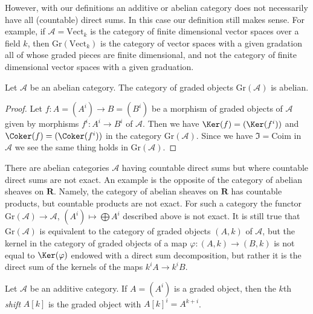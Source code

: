 \medskip\noindent
However, with our definitions an additive or abelian category does not
necessarily have all (countable) direct sums. In this case our definition
still makes sense. For example, if $\mathcal{A} = \text{Vect}_k$ is the
category of finite dimensional vector spaces over a field $k$, then
$\text{Gr}(\text{Vect}_k)$ is the category of vector
spaces with a given gradation all of whose graded pieces are finite
dimensional, and not the category of finite dimensional vector
spaces with a given graduation.

\begin{lemma}
\label{lemma-graded}
Let $\mathcal{A}$ be an abelian category. The category of graded objects
$\text{Gr}(\mathcal{A})$ is abelian.
\end{lemma}

\begin{proof}
Let $f : A = (A^i) \to B = (B^i)$ be a morphism of graded objects
of $\mathcal{A}$ given by
morphisms $f^i : A^i \to B^i$ of $\mathcal{A}$.
Then we have $\Ker(f) = (\Ker(f^i))$ and $\Coker(f) = (\Coker(f^i))$
in the category $\text{Gr}(\mathcal{A})$.
Since we have $\Im = \text{Coim}$ in $\mathcal{A}$
we see the same thing holds in $\text{Gr}(\mathcal{A})$.
\end{proof}

\begin{remark}[Warning]
\label{remark-direct-sums-not-exact}
There are abelian categories $\mathcal{A}$ having countable direct sums
but where countable direct sums are not exact. An example
is the opposite of the category of abelian sheaves on $\mathbf{R}$.
Namely, the category of abelian sheaves on $\mathbf{R}$ has
countable products, but countable products are not exact.
For such a category the functor $\text{Gr}(\mathcal{A}) \to \mathcal{A}$,
$(A^i) \mapsto \bigoplus A^i$
described above is not exact. It is still true that
$\text{Gr}(\mathcal{A})$ is equivalent to the category of
graded objects $(A, k)$ of $\mathcal{A}$, but the kernel in the category
of graded objects of a map $\varphi : (A, k) \to (B, k)$ is not equal to
$\Ker(\varphi)$ endowed with a direct sum decomposition, but rather it is
the direct sum of the kernels of the maps $k^iA \to k^iB$.
\end{remark}

\begin{definition}
\label{definition-graded-shift}
Let $\mathcal{A}$ be an additive category. If $A = (A^i)$ is a graded object,
then the $k$th {\it shift} $A[k]$ is the graded object with
$A[k]^i = A^{k + i}$.
\end{definition}

